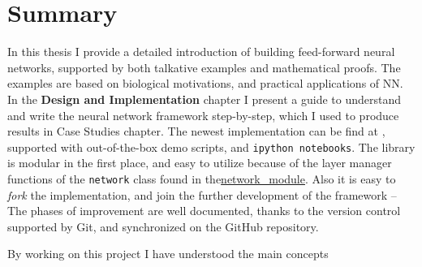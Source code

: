 \chapter{Summary}

In this thesis I provide a detailed introduction of building feed-forward neural networks, supported by both talkative examples and mathematical proofs. 
The examples are based on biological motivations, and practical applications of NN. 
In the \textbf{Design and Implementation} chapter I present a guide to understand and write the neural network framework step-by-step, which I used to produce results in Case Studies chapter. 
The newest implementation can be find at \cite{DV}, supported with out-of-the-box demo scripts, and \texttt{ipython notebooks}.
The library is modular in the first place, and easy to utilize because of the layer manager functions of the \texttt{network} class found in the\url{network_module}. 
Also it is easy to \emph{fork} the implementation, and join the further development of the framework -- The phases of improvement are well documented, thanks to the version control supported by Git, and synchronized on the GitHub repository.

By working on this project I have understood the main concepts 